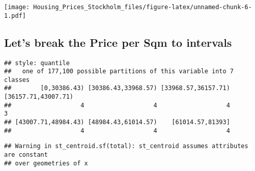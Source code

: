 \documentclass[
]{article}
\newenvironment{Shaded}{\begin{snugshade}}{\end{snugshade}}
\newcommand{\AttributeTok}[1]{\textcolor[rgb]{0.77,0.63,0.00}{#1}}
\newcommand{\DecValTok}[1]{\textcolor[rgb]{0.00,0.00,0.81}{#1}}
\newcommand{\FunctionTok}[1]{\textcolor[rgb]{0.00,0.00,0.00}{#1}}
\newcommand{\NormalTok}[1]{#1}
\newcommand{\OtherTok}[1]{\textcolor[rgb]{0.56,0.35,0.01}{#1}}
\newcommand{\SpecialCharTok}[1]{\textcolor[rgb]{0.00,0.00,0.00}{#1}}
\newcommand{\StringTok}[1]{\textcolor[rgb]{0.31,0.60,0.02}{#1}}
\begin{document}
\texttt{[image: Housing\_Prices\_Stockholm\_files/figure-latex/unnamed-chunk-6-1.pdf]}

\hypertarget{lets-break-the-price-per-sqm-to-intervals}{%
\subsection{Let's break the Price per Sqm to
intervals}\label{lets-break-the-price-per-sqm-to-intervals}}

\begin{Shaded}
\end{Shaded}

\begin{verbatim}
## style: quantile
##   one of 177,100 possible partitions of this variable into 7 classes
##        [0,30386.43) [30386.43,33968.57) [33968.57,36157.71) [36157.71,43007.71) 
##                   4                   4                   4                   3 
## [43007.71,48984.43) [48984.43,61014.57)    [61014.57,81393] 
##                   4                   4                   4
\end{verbatim}

\begin{Shaded}
\end{Shaded}

\begin{verbatim}
## Warning in st_centroid.sf(total): st_centroid assumes attributes are constant
## over geometries of x
\end{verbatim}
\end{document}
